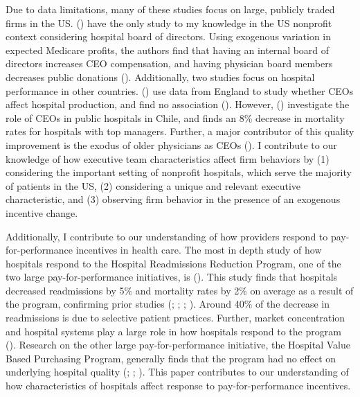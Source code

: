\documentclass[12pt]{article}
\begin{document}
    Due to data limitations, many of these studies focus on large, publicly traded firms in the US. \citeauthor{brickley2010board} (\citeyear{brickley2010board}) have the only study to my knowledge in the US nonprofit context considering hospital board of directors. Using exogenous variation in expected Medicare profits, the authors find that having an internal board of directors increases CEO compensation, and having physician board members decreases public donations (\cite{brickley2010board}). Additionally, two studies focus on hospital performance in other countries. \citeauthor{janke2019impact} (\citeyear{janke2019impact}) use data from England to study whether CEOs affect hospital production, and find no association (\cite{janke2019impact}). However, \citeauthor{otero2022managers} (\citeyear{otero2022managers}) investigate the role of CEOs in public hospitals in Chile, and finds an 8\% decrease in mortality rates for hospitals with top managers. Further, a major contributor of this quality improvement is the exodus of older physicians as CEOs (\cite{otero2022managers}). I contribute to our knowledge of how executive team characteristics affect firm behaviors by (1) considering the important setting of nonprofit hospitals, which serve the majority of patients in the US, (2) considering a unique and relevant executive characteristic, and (3) observing firm behavior in the presence of an exogenous incentive change. 

    Additionally, I contribute to our understanding of how providers respond to pay-for-performance incentives in health care. The most in depth study of how hospitals respond to the Hospital Readmissions Reduction Program, one of the two large pay-for-performance initiatives, is \citeauthor{gupta2021impacts} (\citeyear{gupta2021impacts}). This study finds that hospitals decreased readmissions by 5\% and mortality rates by 2\% on average as a result of the program, confirming prior studies (\cite{mellor2017does}; \cite{ziedan2018essays}; \cite{ody2019decreases}; \cite{gupta2021impacts}). Around 40\% of the decrease in readmissions is due to selective patient practices. Further, market concentration and hospital systems play a large role in how hospitals respond to the program (\cite{kunz2024assessing}). Research on the other large pay-for-performance initiative, the Hospital Value Based Purchasing Program, generally finds that the program had no effect on underlying hospital quality (\cite{us2015hospital}; \cite{norton2018moneyball}; \cite{friedson2019so}). This paper contributes to our understanding of how characteristics of hospitals affect response to pay-for-performance incentives.
\end{document}

